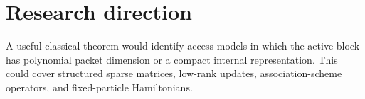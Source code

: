 \section{Research direction}
A useful classical theorem would identify access models in which the active block has polynomial packet dimension or a compact internal representation. This could cover structured sparse matrices, low-rank updates, association-scheme operators, and fixed-particle Hamiltonians.
